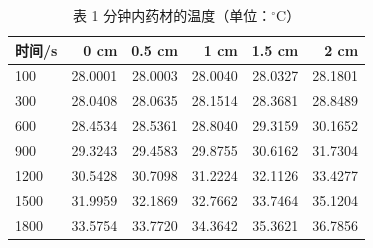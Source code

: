 \begin{table}[H]
\centering
\caption{表 1 分钟内药材的温度（单位：$^\circ$C）}
\label{tab:p1T}
\small
\begin{tabular}{@{}lrrrrr@{}}
\toprule
时间/s & 0 cm & 0.5 cm & 1 cm & 1.5 cm & 2 cm \\
\midrule
100 & 28.0001 & 28.0003 & 28.0040 & 28.0327 & 28.1801 \\
300 & 28.0408 & 28.0635 & 28.1514 & 28.3681 & 28.8489 \\
600 & 28.4534 & 28.5361 & 28.8040 & 29.3159 & 30.1652 \\
900 & 29.3243 & 29.4583 & 29.8755 & 30.6162 & 31.7304 \\
1200 & 30.5428 & 30.7098 & 31.2224 & 32.1126 & 33.4277 \\
1500 & 31.9959 & 32.1869 & 32.7662 & 33.7464 & 35.1204 \\
1800 & 33.5754 & 33.7720 & 34.3642 & 35.3621 & 36.7856 \\
\bottomrule
\end{tabular}
\end{table}
